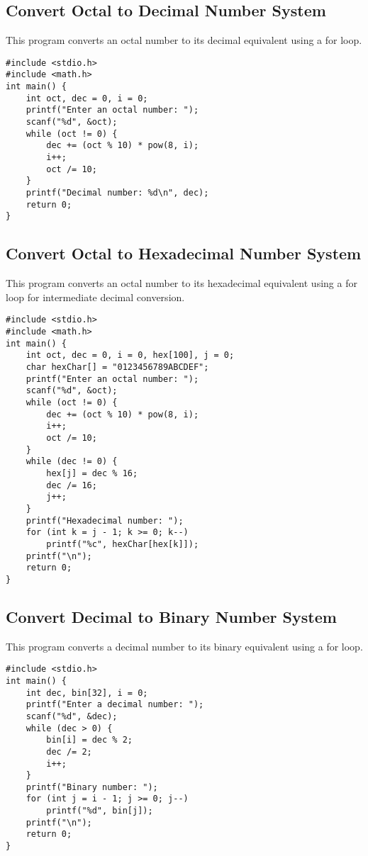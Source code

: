 \documentclass[a4paper,12pt]{article}
\begin{document}
\newpage

\subsection{Convert Octal to Decimal Number System}
This program converts an octal number to its decimal equivalent using a for loop.

\begin{lstlisting}[caption={Convert Octal to Decimal Number System}]
#include <stdio.h>
#include <math.h>
int main() {
    int oct, dec = 0, i = 0;
    printf("Enter an octal number: ");
    scanf("%d", &oct);
    while (oct != 0) {
        dec += (oct % 10) * pow(8, i);
        i++;
        oct /= 10;
    }
    printf("Decimal number: %d\n", dec);
    return 0;
}
\end{lstlisting}

\newpage

\subsection{Convert Octal to Hexadecimal Number System}
This program converts an octal number to its hexadecimal equivalent using a for loop for intermediate decimal conversion.

\begin{lstlisting}[caption={Convert Octal to Hexadecimal Number System}]
#include <stdio.h>
#include <math.h>
int main() {
    int oct, dec = 0, i = 0, hex[100], j = 0;
    char hexChar[] = "0123456789ABCDEF";
    printf("Enter an octal number: ");
    scanf("%d", &oct);
    while (oct != 0) {
        dec += (oct % 10) * pow(8, i);
        i++;
        oct /= 10;
    }
    while (dec != 0) {
        hex[j] = dec % 16;
        dec /= 16;
        j++;
    }
    printf("Hexadecimal number: ");
    for (int k = j - 1; k >= 0; k--)
        printf("%c", hexChar[hex[k]]);
    printf("\n");
    return 0;
}
\end{lstlisting}

\newpage

\subsection{Convert Decimal to Binary Number System}
This program converts a decimal number to its binary equivalent using a for loop.

\begin{lstlisting}[caption={Convert Decimal to Binary Number System}]
#include <stdio.h>
int main() {
    int dec, bin[32], i = 0;
    printf("Enter a decimal number: ");
    scanf("%d", &dec);
    while (dec > 0) {
        bin[i] = dec % 2;
        dec /= 2;
        i++;
    }
    printf("Binary number: ");
    for (int j = i - 1; j >= 0; j--)
        printf("%d", bin[j]);
    printf("\n");
    return 0;
}
\end{lstlisting}
\end{document}
